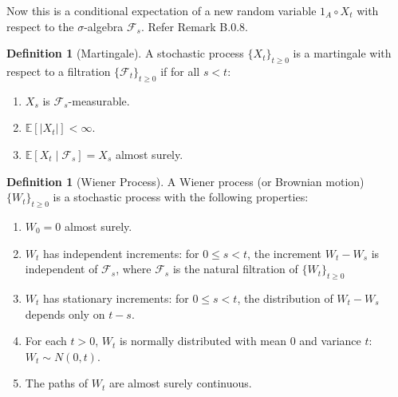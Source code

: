 \documentclass[11pt]{amsart}
\theoremstyle{plain}
\theoremstyle{definition}
\newtheorem{definition}[theorem]{Definition}
\theoremstyle{remark}
\numberwithin{equation}{section}
\begin{document}
{
Now this is a conditional expectation of a new random variable $1_A \circ X_t$ with respect to the $\sigma$-algebra $\mathcal{F}_s$. Refer Remark B.0.8.

\begin{definition}[Martingale]
    A stochastic process $\{X_t\}_{t \geq 0}$ is a martingale with respect to a filtration $\{\mathcal{F}_t\}_{t \geq 0}$ if for all $s < t$:
    \begin{enumerate}
        \item $X_s$ is $\mathcal{F}_s$-measurable.
        \item $\mathbb{E}[|X_t|] < \infty$.
        \item $\mathbb{E}[X_t \mid \mathcal{F}_s] = X_s$ almost surely.
    \end{enumerate}
\end{definition}  





\begin{definition}[Wiener Process]
    A Wiener process (or Brownian motion) $\{W_t\}_{t \geq 0}$ is a stochastic process with the following properties:
    \begin{enumerate}
        \item $W_0 = 0$ almost surely.
        \item $W_t$ has independent increments: for $0 \leq s < t$, the increment $W_t - W_s$ is independent of $\mathcal{F}_s$, where $\mathcal{F}_s$ is the natural filtration of $\{W_t\}_{t \geq 0}$ 
        \item $W_t$ has stationary increments: for $0 \leq s < t$, the distribution of $W_t - W_s$ depends only on $t-s$.
        \item For each $t > 0$, $W_t$ is normally distributed with mean 0 and variance $t$: $W_t \sim N(0, t)$.
        \item The paths of $W_t$ are almost surely continuous.
    \end{enumerate}
\end{definition}  

}
\end{document}
